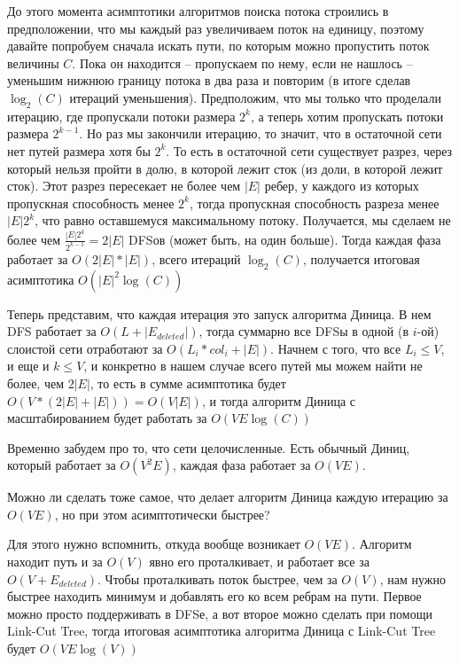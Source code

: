 \noindent До этого момента асимптотики алгоритмов поиска потока строились в предположении, что мы каждый раз увеличиваем поток на единицу, поэтому давайте попробуем сначала искать пути, по которым можно пропустить поток величины $C$. Пока он находится -- пропускаем по нему, если не нашлось -- уменьшим нижнюю границу потока в два раза и повторим (в итоге сделав $\log_2(C)$ итераций уменьшения). Предположим, что мы только что проделали итерацию, где пропускали потоки размера $2^k$, а теперь хотим пропускать потоки размера $2^{k-1}$. Но раз мы закончили итерацию, то значит, что в остаточной сети нет путей размера хотя бы $2^k$. То есть в остаточной сети существует разрез, через который нельзя пройти в долю, в которой лежит сток (из доли, в которой лежит сток). Этот разрез пересекает не более чем $|E|$ ребер, у каждого из которых пропускная способность менее $2^k$, тогда пропускная способность разреза менее $|E|2^k$, что равно оставшемуся максимальному потоку. Получается, мы сделаем не более чем $\frac{|E|2^k}{2^{k-1}} = 2|E|$ DFSов (может быть, на один больше). Тогда каждая фаза работает за $O(2|E| * |E|)$, всего итераций $\log_2(C)$, получается итоговая асимптотика $O(|E|^2\log(C))$ 

\noindent Теперь представим, что каждая итерация это запуск алгоритма Диница. В нем DFS работает за $O(L + |E_{deleted}|)$, тогда суммарно все DFSы в одной (в $i$-ой) слоистой сети отработают за $O(L_i * col_i + |E|)$. Начнем с того, что все $L_i \leq V$, и еще и $k \leq V$, и конкретно в нашем случае всего путей мы можем найти не более, чем $2|E|$, то есть в сумме асимптотика будет $O(V * (2|E| + |E|)) = O(V|E|)$, и тогда алгоритм Диница с масштабированием будет работать за $O(VE\log(C))$ 

\noindent Временно забудем про то, что сети целочисленные. Есть обычный Диниц, который работает за $O(V^2E)$, каждая фаза работает за $O(VE)$.

\begin{problem}
    Можно ли сделать тоже самое, что делает алгоритм Диница каждую итерацию за $O(VE)$, но при этом асимптотически быстрее?
\end{problem}

\begin{solution}
    Для этого нужно вспомнить, откуда вообще возникает $O(VE)$. Алгоритм находит путь и за $O(V)$ явно его проталкивает, и работает все за $O(V + E_{deleted})$. Чтобы проталкивать поток быстрее, чем за $O(V)$, нам нужно быстрее находить минимум и добавлять его ко всем ребрам на пути. Первое можно просто поддерживать в DFSе, а вот второе можно сделать при помощи Link-Cut Tree, тогда итоговая асимптотика алгоритма Диница с Link-Cut Tree будет $O(VE\log(V))$
\end{solution} %

